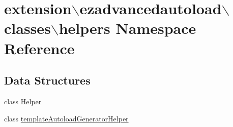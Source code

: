 \hypertarget{namespaceextension_1_1ezadvancedautoload_1_1classes_1_1helpers}{\section{extension$\backslash$ezadvancedautoload$\backslash$classes$\backslash$helpers Namespace Reference}
\label{namespaceextension_1_1ezadvancedautoload_1_1classes_1_1helpers}
}
\subsection*{Data Structures}
\begin{DoxyCompactItemize}
\item 
class \hyperlink{classextension_1_1ezadvancedautoload_1_1classes_1_1helpers_1_1_helper}{Helper}
\item 
class \hyperlink{classextension_1_1ezadvancedautoload_1_1classes_1_1helpers_1_1template_autoload_generator_helper}{template\-Autoload\-Generator\-Helper}
\end{DoxyCompactItemize}
